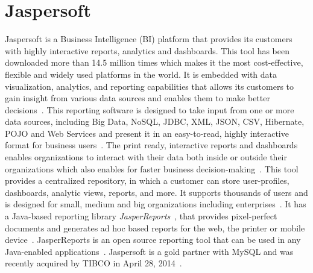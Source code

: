 \section{Jaspersoft}

Jaspersoft is a Business Intelligence (BI) platform that provides its
customers with highly interactive reports, analytics and dashboards. This tool
has been downloaded more than 14.5 million times which makes it the most
cost-effective, flexible and widely used platforms in the world. It is embedded
with data visualization, analytics, and reporting capabilities that allows its
customers to gain insight from various data sources and enables them to make
better decisions~\cite{hid-sp18-516-www-finances-online}. This reporting
software is designed to take input from one or more
data sources, including Big Data, NoSQL, JDBC, XML, JSON, CSV, Hibernate, POJO
and Web Services and present it in an easy-to-read, highly interactive format
for business users~\cite{hid-sp18-516-www-jaspersoft-overview}. The print ready,
interactive reports and dashboards enables organizations to interact with their
data both inside or outside their organizations which also enables for faster
business decision-making~\cite{hid-sp18-516-www-jaspersoft-overview}. This tool
provides a centralized repository, in which a customer can store user-profiles,
dashboards, analytic views, reports, and more. It supports thousands of users
and is designed for small, medium and big organizations including
enterprises~\cite{hid-sp18-516-www-finances-online}. It has a Java-based
reporting library
\textit{JasperReports}~\cite{hid-sp18-516-www-finances-online}, that provides
pixel-perfect documents and generates ad hoc based reports for the web, the
printer or mobile device~\cite{hid-sp18-516-www-jaspersoft-overview}.
JasperReports is an open source reporting tool that can be
used in any Java-enabled
applications~\cite{hid-sp18-516-www-wiki-jasperreports}. Jaspersoft is a gold
partner with MySQL and was recently acquired by TIBCO in April 28,
2014~\cite{hid-sp18-516-www-wiki-jasperreports}.

